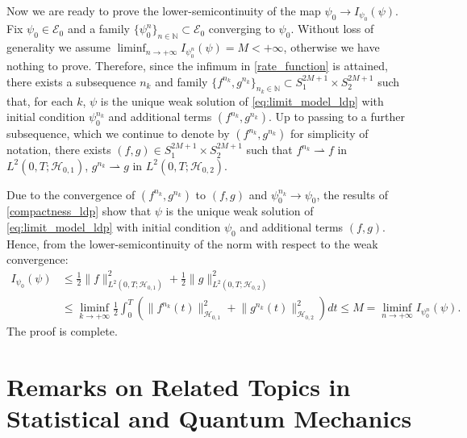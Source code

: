 \documentclass[a4paper,10pt]{amsart}
\theoremstyle{remark}
\numberwithin{equation}{section}
\begin{document}
    Now we are ready to prove the lower-semicontinuity of the map $\psi_0\rightarrow I_{\psi_0}(\psi)$. 
    Fix $\psi_0\in \mathcal{E}_0$ and a family $\{\psi_0^n\}_{n\in \mathbb{N}}\subset \mathcal{E}_0 $ converging to $\psi_0$. Without loss of generality we assume $\liminf_{n\rightarrow +\infty}I_{\psi_0^n}(\psi)=M<+\infty$, otherwise we have nothing to prove. Therefore, since the infimum in \eqref{rate_function} is attained, there exists a subsequence $n_k$ and family $\{f^{n_k}, g^{n_k}\}_{n_k\in\mathbb{N}}\subset S_1^{2M+1}\times S_2^{2M+1}$ such that, for each $k$, $\psi$ is the unique weak solution of \eqref{eq:limit_model_ldp} with initial condition $\psi_0^{n_k}$ and additional terms $(f^{n_k},g^{n_k})$.
Up to passing to a further subsequence, which we continue to denote by $(f^{n_k},g^{n_k})$ for simplicity of notation, there exists $(f,g)\in S^{2M+1}_1\times S^{2M+1}_2$ such that $f^{n_k}\rightharpoonup f$ in $L^2(0,T; \mathcal{H}_{0,1})$, $g^{n_k}\rightharpoonup g$ in $L^2(0,T; \mathcal{H}_{0,2})$. 

Due to the convergence of $(f^{n_k}, g^{n_k})$ to $(f,g)$ and
$\psi_0^{n_k}\to\psi_0$, the results of \cref{compactness_ldp} show that
$\psi$ is the unique weak solution of \eqref{eq:limit_model_ldp} with
initial condition $\psi_0$ and additional terms $(f,g)$.
Hence, from the lower-semicontinuity of the norm with respect to the weak convergence: 
\begin{align*}
    I_{\psi_0}(\psi)&\leq \frac{1}{2} \lVert f\rVert^2_{L^2(0,T;\mathcal{H}_{0,1})}  +\frac{1}{2} \lVert g\rVert^2_{L^2(0,T;\mathcal{H}_{0,2})}  \\ &
    \leq 
    \liminf_{k\rightarrow +\infty}
    \frac{1}{2}\int_0^T
    \left(\lVert f^{n_k}(t)\rVert^2_{\mathcal{H}_{0,1}}
    +\lVert g^{n_k}(t)\rVert^2_{\mathcal{H}_{0,2}}\right)dt
    \leq M=\liminf_{n\rightarrow +\infty} I_{\psi_0^n}(\psi).
\end{align*}
The proof is complete.



\appendix

\section{Remarks on Related Topics in Statistical and Quantum Mechanics}\label{sec:appendix_formal}
\end{document}
